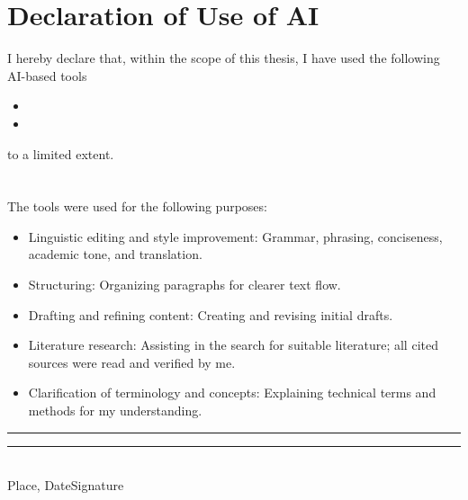 \section*{\centering Declaration of Use of AI}\thispagestyle{plain}\label{ai}
I hereby declare that, within the scope of this thesis, I have used the following AI-based tools 

\begin{itemize}
	\item 
	\item 
\end{itemize}

to a limited extent.
\\
\\
\\
The tools were used for the following purposes:
\begin{itemize}
	\item Linguistic editing and style improvement: Grammar, phrasing, conciseness, academic tone, and translation.
		\item Structuring: Organizing paragraphs for clearer text flow.
	\item Drafting and refining content: Creating and revising initial drafts.
	\item Literature research: Assisting in the search for suitable literature; all cited sources were read and verified by me.
	\item Clarification of terminology and concepts: Explaining technical terms and methods for my understanding.
\end{itemize}

\vspace{2.5cm}
\rule{5cm}{0.2pt}\hfill\rule{5cm}{0.2pt}\\
\footnotesize\phantom{}\hspace{17mm} Place, Date\hfill Signature\hspace{17mm}
\clearpage\normalsize

\clearpage